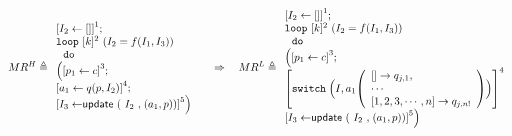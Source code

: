 \documentclass[a4paper,11pt]{article}
\begin{document}
\begin{example}
\[
MR^H \triangleq
\begin{array}{l}
    \left[I_2 \leftarrow [] \right]^1; \\
    \eloop ~ [k]^{2} ~ (I_2 = f(I_1, I_3)) \\ 
    \ ~ \edo ~ \\ \Big(
    \left[p_1 \leftarrow c \right]^3 ; \\
    \left[a_1 \leftarrow q(p, I_2) \right]^4; \\
    \left[I_3 \leftarrow \eupdt( {I_2}, (a_1, p))  \right]^5
    \Big) 
\end{array}
%
~~~~ \Rightarrow ~~~
%
MR^L \triangleq
\begin{array}{l}
    \left[I_2 \leftarrow [] \right]^1; \\
    \eloop ~ [k]^{2} ~ (I_2 = f(I_1, I_3)) \\ 
    \ ~ \edo ~ \\ \Big(
    \left[p_1 \leftarrow c \right]^3 ; \\
    \left[
    \eswitch \Big( I, a_1
    \left(\begin{array}{l}
        [ ] \to q_{j,1},\\
        \cdots\\
    \clabel{1, 2, 3, \cdots, n} \to q_{j,n!}
    \end{array}\right)
    \Big)
    \right]^4\\
    \left[I_3 \leftarrow \eupdt( {I_2}, (a_1, p))  \right]^5
    \Big) 
\end{array}
%
\]
\end{example}
\end{document}
